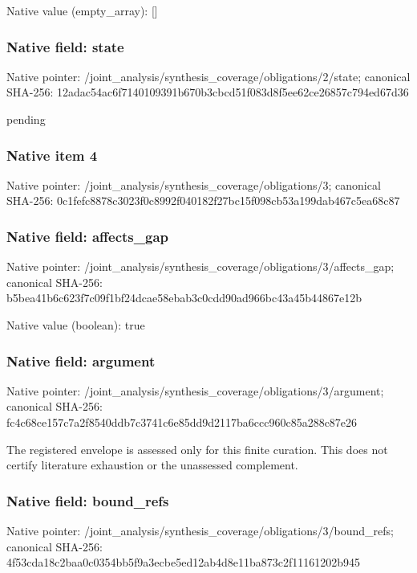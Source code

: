 \documentclass[10pt,a4paper]{article}
\begin{document}
Native value (empty\_\allowbreak{}array): []

\subsubsection{Native field: state}
Native pointer: /joint\_\allowbreak{}analysis/synthesis\_\allowbreak{}coverage/obligations/2/state; canonical SHA-256: 12adac54ac6f7140109391b670b3cbcd51f083d8f5ee62ce26857c794ed67d36

\begingroup\raggedright\sloppy pending\par\endgroup

\subsubsection{Native item 4}
Native pointer: /joint\_\allowbreak{}analysis/synthesis\_\allowbreak{}coverage/obligations/3; canonical SHA-256: 0c1fefc8878c3023f0c8992f040182f27bc15f098cb53a199dab467c5ea68c87

\subsubsection{Native field: affects\_\allowbreak{}gap}
Native pointer: /joint\_\allowbreak{}analysis/synthesis\_\allowbreak{}coverage/obligations/3/affects\_\allowbreak{}gap; canonical SHA-256: b5bea41b6c623f7c09f1bf24dcae58ebab3c0cdd90ad966bc43a45b44867e12b

Native value (boolean): true

\subsubsection{Native field: argument}
Native pointer: /joint\_\allowbreak{}analysis/synthesis\_\allowbreak{}coverage/obligations/3/argument; canonical SHA-256: fc4c68ce157c7a2f8540ddb7c3741c6e85dd9d2117ba6ccc960c85a288c87e26

\begingroup\raggedright\sloppy The registered envelope is assessed only for this finite curation. This does not certify literature exhaustion or the unassessed complement.\par\endgroup

\subsubsection{Native field: bound\_\allowbreak{}refs}
Native pointer: /joint\_\allowbreak{}analysis/synthesis\_\allowbreak{}coverage/obligations/3/bound\_\allowbreak{}refs; canonical SHA-256: 4f53cda18c2baa0c0354bb5f9a3ecbe5ed12ab4d8e11ba873c2f11161202b945
\end{document}
